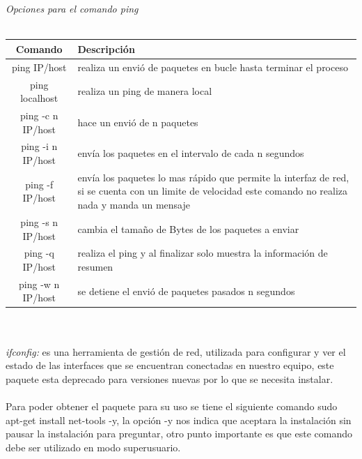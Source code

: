 \documentclass[10pt,a4paper,titlepage]{article}
\begin{document}
	\\
	\\
	\emph{Opciones para el comando ping}
	\\
	\\
	\begin{tabular}{|c|p{8cm}|}
		\hline
		Comando & Descripción \\
		\hline
		ping IP/host & realiza un envió de paquetes en bucle hasta terminar el proceso \\
		\hline
		ping localhost & realiza un ping de manera local \\
		\hline
		ping -c n IP/host & hace un envió de n paquetes  \\
		\hline
		ping -i n IP/host & envía los paquetes en el intervalo de cada n segundos  \\
		\hline
		ping -f IP/host & envía los paquetes lo mas rápido que permite la interfaz de red, si se cuenta con un limite de velocidad este comando no realiza nada y manda un mensaje \\
		\hline
		ping -s n IP/host & cambia el tamaño de Bytes de los paquetes a enviar \\
		\hline
		ping -q IP/host & realiza el ping y al finalizar solo muestra la información de resumen \\
		\hline
		ping -w n IP/host & se detiene el envió de paquetes pasados n segundos \\
		\hline
	\end{tabular}
	\\
	\\
	\emph{ifconfig:} es una herramienta de gestión de red, utilizada para configurar y ver el estado de las interfaces que se encuentran conectadas en nuestro equipo, este paquete esta deprecado para versiones nuevas por lo que se necesita instalar.
	\\
	\\
	Para poder obtener el paquete para su uso se tiene el siguiente comando sudo apt-get install net-tools -y, la opción -y nos indica que aceptara la instalación sin pausar la instalación para preguntar, otro punto importante es que este comando debe ser utilizado en modo superusuario.
	\\
	\\
\end{document}
